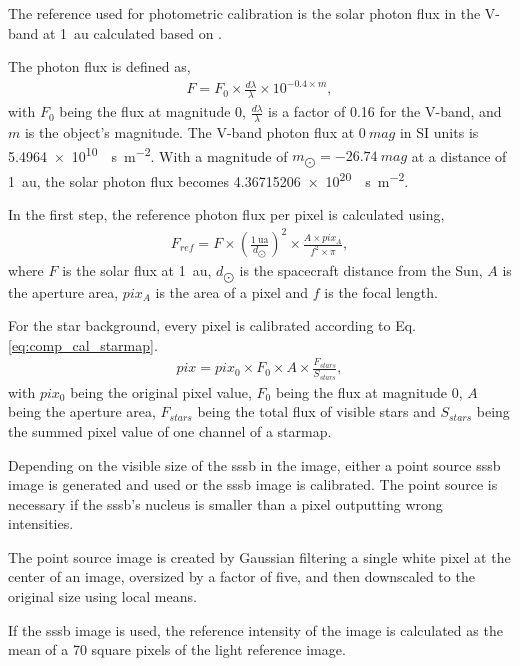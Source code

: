 The reference used for photometric calibration is the solar photon flux in the V-band at \SI{1}{\astronomicalunit} calculated based on \cite{wirth}.

The photon flux is defined as,
\begin{align}
    F = F_0 \times \frac{d\lambda}{\lambda} \times 10^{-0.4 \times m}, \label{eq:comp_flux_0mag}
\end{align}
with $F_0$ being the flux at magnitude 0, $\frac{d\lambda}{\lambda}$ is a factor of 0.16 for the V-band, and $m$ is the object's magnitude. The V-band photon flux at $0~mag$ in SI units is \SI{5.4964e10}{\per\second \per\square\meter}. With a magnitude of $m_{\bigodot} = -26.74~mag$ at a distance of \SI{1}{\astronomicalunit}, the solar photon flux becomes \SI{4.36715206e+20}{\per\second\per\square\meter}.

In the first step, the reference photon flux per pixel is calculated using,
\begin{align}
        F_{ref} = F \times \left(\frac{\SI{1}{\astronomicalunit}}{d_{\bigodot}}\right)^2 \times \frac{A \times pix_A}{f^2 \times \pi}, \label{eq:comp_ref_flux}
\end{align}
where $F$ is the solar flux at \SI{1}{\astronomicalunit}, $d_{\bigodot}$ is the spacecraft distance from the Sun, $A$ is the aperture area, $pix_A$ is the area of a pixel and $f$ is the focal length.

For the star background, every pixel is calibrated according to Eq. \ref{eq:comp_cal_starmap}.
\begin{align}
        pix = pix_0 \times F_0 \times A \times \frac{F_{stars}}{S_{stars}}, \label{eq:comp_cal_starmap}
\end{align}
with $pix_0$ being the original pixel value, $F_0$ being the flux at magnitude 0, $A$ being the aperture area, $F_{stars}$ being the total flux of visible stars and $S_{stars}$ being the summed pixel value of one channel of a starmap.

Depending on the visible size of the \gls{sssb} in the image, either a point source \gls{sssb} image is generated and used or the \gls{sssb} image is calibrated. The point source is necessary if the \gls{sssb}'s nucleus is smaller than a pixel outputting wrong intensities.

The point source image is created by Gaussian filtering a single white pixel at the center of an image, oversized by a factor of five, and then downscaled to the original size using local means.

If the \gls{sssb} image is used, the reference intensity of the image is calculated as the mean of a \SI{70}{} square pixels of the light reference image.

